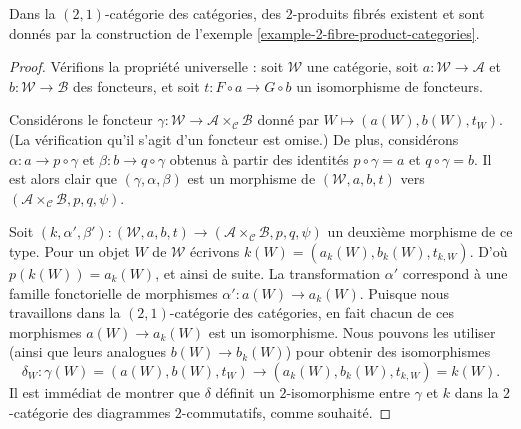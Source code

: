 \begin{lemma}
\label{lemma-2-fibre-product-categories}
Dans la $(2, 1)$-catégorie des catégories, des $2$-produits fibrés existent
et sont donnés par la construction de l'exemple
\ref{example-2-fibre-product-categories}.
\end{lemma}

\begin{proof}
Vérifions la propriété universelle : soit $\mathcal{W}$ une catégorie, soit $a : \mathcal{W} \to \mathcal{A}$ et $b : \mathcal{W} \to \mathcal{B}$ des
foncteurs, et soit $t : F \circ a \to G \circ b$ un isomorphisme de foncteurs.

\medskip\noindent
Considérons le foncteur $\gamma : \mathcal{W} \to \mathcal{A} \times_\mathcal{C}\mathcal{B}$ donné par $W \mapsto (a(W), b(W), t_W)$.
(La vérification qu'il s'agit d'un foncteur est omise.) De plus, considérons $\alpha : a \to p \circ \gamma$ et $\beta : b \to q \circ \gamma$ obtenus à partir des
identités $p \circ \gamma = a$ et $q \circ \gamma = b$. Il est alors clair que
$(\gamma, \alpha, \beta)$ est un morphisme de $(\mathcal{W}, a, b, t)$ vers $(\mathcal{A} \times_\mathcal{C} \mathcal{B}, p, q, \psi)$.

\medskip\noindent
Soit $(k, \alpha', \beta') :
(\mathcal{W}, a, b, t) \to (\mathcal{A} \times_\mathcal{C} \mathcal{B}, p, q, \psi)$ un deuxième morphisme de ce type. Pour un objet $W$
de $\mathcal{W}$ écrivons $k(W) = (a_k(W), b_k(W), t_{k, W})$. D'où $p(k(W)) = a_k(W)$, et ainsi de suite. La transformation $\alpha'$ correspond à une
famille fonctorielle de morphismes $\alpha' : a(W) \to a_k(W)$. Puisque nous
travaillons dans la $(2, 1)$-catégorie des catégories, en fait chacun de ces
morphismes $a(W) \to a_k(W)$ est un isomorphisme. Nous pouvons les utiliser
(ainsi que leurs analogues $b(W) \to b_k(W)$) pour obtenir des isomorphismes
$$
\delta_W :
\gamma(W) = (a(W), b(W), t_W)
\longrightarrow
(a_k(W), b_k(W), t_{k, W}) = k(W).
$$
Il est immédiat de montrer que $\delta$ définit un $2$-isomorphisme entre
$\gamma$ et $k$ dans la $2$-catégorie des diagrammes $2$-commutatifs, comme
souhaité.
\end{proof}

